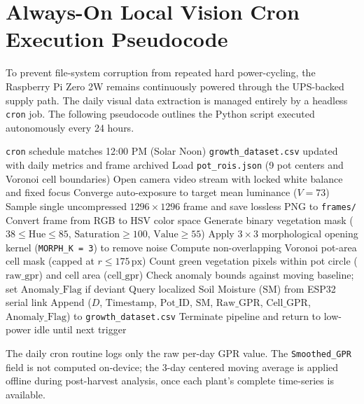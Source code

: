 
\chapter{Always-On Local Vision Cron Execution Pseudocode}

\ifpdf
    \graphicspath{{Appendix7/Figs/Raster/}{Appendix7/Figs/PDF/}{Appendix7/Figs/}}
\else
    \graphicspath{{Appendix7/Figs/Vector/}{Appendix7/Figs/}}
\fi

To prevent file-system corruption from repeated hard power-cycling, the Raspberry Pi Zero 2W remains continuously powered through the UPS-backed supply path. The daily visual data extraction is managed entirely by a headless \texttt{cron} job. The following pseudocode outlines the Python script executed autonomously every 24 hours.

\begin{algorithmic}[1]
\renewcommand{\algorithmicrequire}{\textbf{Trigger:}}
\renewcommand{\algorithmicensure}{\textbf{Output:}}
\REQUIRE \texttt{cron} schedule matches 12:00 PM (Solar Noon)
\ENSURE \texttt{growth\_dataset.csv} updated with daily metrics and frame archived
\STATE Load \texttt{pot\_rois.json} (9 pot centers and Voronoi cell boundaries)
\STATE Open camera video stream with locked white balance and fixed focus
\STATE Converge auto-exposure to target mean luminance ($V = 73$)
\STATE Sample single uncompressed $1296 \times 1296$ frame and save lossless PNG to \texttt{frames/}
\STATE Convert frame from RGB to HSV color space
\STATE Generate binary vegetation mask ($38 \le \text{Hue} \le 85$, $\text{Saturation} \ge 100$, $\text{Value} \ge 55$)
\STATE Apply $3 \times 3$ morphological opening kernel (\texttt{MORPH\_K = 3}) to remove noise
    \STATE Compute non-overlapping Voronoi pot-area cell mask (capped at $r \le 175\,\mathrm{px}$)
    \STATE Count green vegetation pixels within pot circle ($\text{raw\_gpr}$) and cell area ($\text{cell\_gpr}$)
    \STATE Check anomaly bounds against moving baseline; set $\text{Anomaly\_Flag}$ if deviant
    \STATE Query localized Soil Moisture ($\text{SM}$) from ESP32 serial link
    \STATE Append ($D$, $\text{Timestamp}$, $\text{Pot\_ID}$, $\text{SM}$, $\text{Raw\_GPR}$, $\text{Cell\_GPR}$, $\text{Anomaly\_Flag}$) to \texttt{growth\_dataset.csv}
\ENDFOR
\STATE Terminate pipeline and return to low-power idle until next trigger
\end{algorithmic}

\vspace{0.5\baselineskip}
\noindent The daily cron routine logs only the raw per-day GPR value. The \texttt{Smoothed\_GPR} field is not computed on-device; the 3-day centered moving average is applied offline during post-harvest analysis, once each plant's complete time-series is available.

\clearpage
